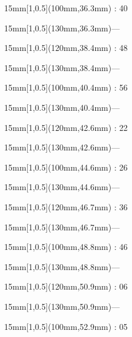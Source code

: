 \documentclass[a4paper]{memoir}
\begin{document}
\begin{textblock*}{15mm}[1,0.5](100mm,36.3mm) : 40\end{textblock*}
\begin{textblock*}{15mm}[1,0.5](130mm,36.3mm)\flushright —\end{textblock*}
\begin{textblock*}{15mm}[1,0.5](120mm,38.4mm) : 48\end{textblock*}
\begin{textblock*}{15mm}[1,0.5](130mm,38.4mm)\flushright —\end{textblock*}
\begin{textblock*}{15mm}[1,0.5](100mm,40.4mm) : 56\end{textblock*}
\begin{textblock*}{15mm}[1,0.5](130mm,40.4mm)\flushright —\end{textblock*}
\begin{textblock*}{15mm}[1,0.5](120mm,42.6mm) : 22\end{textblock*}
\begin{textblock*}{15mm}[1,0.5](130mm,42.6mm)\flushright —\end{textblock*}
\begin{textblock*}{15mm}[1,0.5](100mm,44.6mm) : 26\end{textblock*}
\begin{textblock*}{15mm}[1,0.5](130mm,44.6mm)\flushright —\end{textblock*}
\begin{textblock*}{15mm}[1,0.5](120mm,46.7mm) : 36\end{textblock*}
\begin{textblock*}{15mm}[1,0.5](130mm,46.7mm)\flushright —\end{textblock*}
\begin{textblock*}{15mm}[1,0.5](100mm,48.8mm) : 46\end{textblock*}
\begin{textblock*}{15mm}[1,0.5](130mm,48.8mm)\flushright —\end{textblock*}
\begin{textblock*}{15mm}[1,0.5](120mm,50.9mm) : 06\end{textblock*}
\begin{textblock*}{15mm}[1,0.5](130mm,50.9mm)\flushright —\end{textblock*}
\begin{textblock*}{15mm}[1,0.5](100mm,52.9mm) : 05\end{textblock*}
\end{document}
